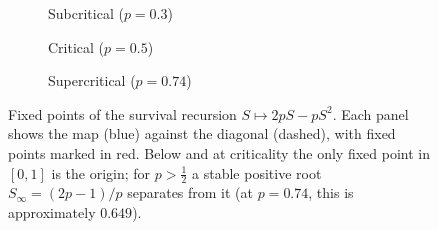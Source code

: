 \documentclass[11pt]{article}
\begin{document}
\begin{figure}[htbp]
    \centering
    \begin{subfigure}[b]{0.325\textwidth}
        \centering
        \caption{Subcritical ($p = 0.3$)}
    \end{subfigure}
    \hfill
    \begin{subfigure}[b]{0.325\textwidth}
        \centering
        \caption{Critical ($p = 0.5$)}
    \end{subfigure}
    \hfill
    \begin{subfigure}[b]{0.325\textwidth}
        \centering
        \caption{Supercritical ($p = 0.74$)}
    \end{subfigure}

    \caption{Fixed points of the survival recursion $S\mapsto 2pS-pS^2$. Each panel shows the map (blue) against the diagonal (dashed), with fixed points marked in red. Below and at criticality the only fixed point in $[0,1]$ is the origin; for $p>\tfrac12$ a stable positive root $S_\infty=(2p-1)/p$ separates from it (at $p=0.74$, this is approximately $0.649$).}
    \label{fig:phase_transition}
\end{figure}
\FloatBarrier
\end{document}
